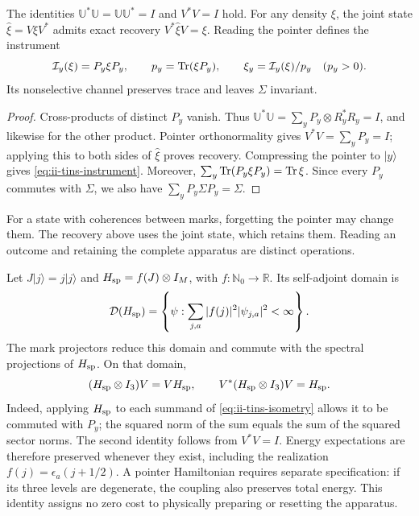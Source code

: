 \begin{proposition}
\label{prop:ii-tins-instrument}
The identities $\mathbb U^*\mathbb U=\mathbb U\mathbb U^*=I$ and
$V^*V=I$ hold. For any density $\xi$, the joint state
$\widehat\xi=V\xi V^*$ admits exact recovery $V^*\widehat\xi V=\xi$.
Reading the pointer defines the instrument
\begin{equation}
 \mathcal I_y(\xi)=P_y\xi P_y,\qquad
 p_y=\operatorname{Tr}(\xi P_y),\qquad
 \xi_y=\mathcal I_y(\xi)/p_y\quad(p_y>0).
 \label{eq:ii-tins-instrument}
\end{equation}
Its nonselective channel preserves trace and leaves $\Sigma$ invariant.
\end{proposition}
\begin{proof}
Cross-products of distinct $P_y$ vanish. Thus
$\mathbb U^*\mathbb U=\sum_yP_y\otimes R_y^*R_y=I$, and likewise
for the other product. Pointer orthonormality gives $V^*V=\sum_yP_y=I$;
applying this to both sides of $\widehat\xi$ proves recovery. Compressing
the pointer to $|y\rangle$ gives \eqref{eq:ii-tins-instrument}.
Moreover, $\sum_y\operatorname{Tr}(P_y\xi P_y)=\operatorname{Tr}\xi$. Since every $P_y$ commutes
with $\Sigma$, we also have $\sum_yP_y\Sigma P_y=\Sigma$.
\end{proof}

For a state with coherences between marks, forgetting the pointer may
change them. The recovery above uses the joint state, which retains them.
Reading an outcome and retaining the complete apparatus are distinct operations.

Let $J|j\rangle=j|j\rangle$ and $H_{\rm sp}=f(J)\otimes I_M$, with
$f:\mathbb N_0\to\mathbb R$. Its self-adjoint domain is
\[
 \mathcal D(H_{\rm sp})=
 \left\{\psi:\sum_{j,a}|f(j)|^2|\psi_{j,a}|^2<\infty\right\}.
\]
The mark projectors reduce this domain and commute with the spectral
projections of $H_{\rm sp}$. On that domain,
\begin{equation}
 (H_{\rm sp}\otimes I_3)V=VH_{\rm sp},\qquad
 V^*(H_{\rm sp}\otimes I_3)V=H_{\rm sp}.
 \label{eq:ii-tins-energy}
\end{equation}
Indeed, applying $H_{\rm sp}$ to each summand of
\eqref{eq:ii-tins-isometry} allows it to be commuted with $P_y$; the
squared norm of the sum equals the sum of the squared sector norms.
The second identity follows from $V^*V=I$. Energy expectations are
therefore preserved whenever they exist, including the realization
$f(j)=\epsilon_a(j+1/2)$. A pointer Hamiltonian requires separate
specification: if its three levels are degenerate, the coupling also
preserves total energy. This identity assigns no zero cost to physically
preparing or resetting the apparatus.

